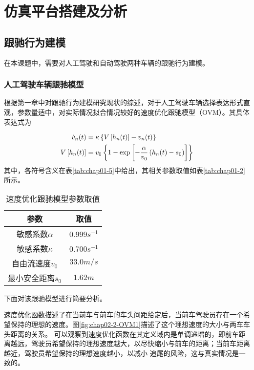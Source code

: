 
\chapter{仿真平台搭建及分析}

\section{跟驰行为建模}
\label{sec:2.2}

在本课题中，需要对人工驾驶和自动驾驶两种车辆的跟驰行为建模。

\subsection{人工驾驶车辆跟驰模型}

根据第一章中对跟驰行为建模研究现状的综述，对于人工驾驶车辆选择表达形式直观，参数量适中，对实际情况拟合情况较好的速度优化跟驰模型（OVM）。其具体表达式为

\begin{align}
  \dot{v}_n(t) &= \kappa \left\{ V \left[ h_n(t) \right] - v_n(t) \right\} \notag \\
  V \left[ h_n(t) \right] &= v_0 \left\{ 1 - \exp \left[ - \frac{\alpha}{v_0}\left(h_n(t)-s_0\right) \right] \right\}
  \label{eq:chap02-1}
\end{align}
其中，各符号含义在表\ref{tab:chap01-5}中给出，其相关参数取值如表\ref{tab:chap01-2}所示。

\begin{table}
  \centering
  \caption{速度优化跟驰模型参数取值}
  \begin{tabular}{cc}
    \toprule
    参数          &  取值                         \\
    \midrule
    敏感系数$\alpha$        & $0.999s^{-1}$         \\
    敏感系数$\kappa$       & $0.700s^{-1}$             \\
    自由流速度$v_0$             & $33.0 m/s$          \\
    最小安全距离$s_0$             & $1.62m$        \\
    \bottomrule
  \end{tabular}
  \label{tab:chap02-1}
\end{table}

下面对该跟驰模型进行简要分析。

速度优化函数描述了在当前车与前车的车头间距给定后，当前车驾驶员存在一个希望保持的理想的速度。图\ref{fig:chap02-2-OVM1}描述了这个理想速度的大小与两车车头距离的关系。
可以观察到速度优化函数在其定义域内是单调递增的，即前车距离越远，驾驶员希望保持的理想速度越大，以尽快缩小与前车的距离；当前车距离越近，驾驶员希望保持的理想速度越小，以减小
追尾的风险，这与真实情况是一致的。

